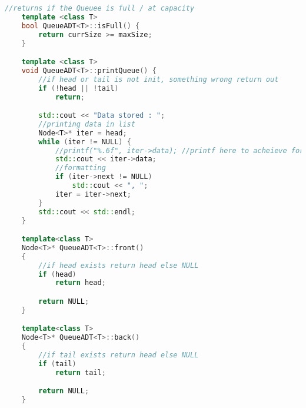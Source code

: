 \documentclass{report}
\begin{document}
\begin{lstlisting}[language=C++]
	//returns if the Queuee is full / at capacity
	template <class T>
	bool QueueADT<T>::isFull() {
		return currSize >= maxSize;
	}

	template <class T>
	void QueueADT<T>::printQueue() {
		//if head or tail is not init, something wrong return out
		if (!head || !tail)
			return;

		std::cout << "Data stored : ";
		//printing data in list
		Node<T>* iter = head;
		while (iter != NULL) {
			//printf("%.6f", iter->data); //printf here to acheieve format
			std::cout << iter->data;
			//formatting
			if (iter->next != NULL)
				std::cout << ", ";
			iter = iter->next;
		}
		std::cout << std::endl;
	}

	template<class T>
	Node<T>* QueueADT<T>::front()
	{
		//if head exists return head else NULL
		if (head)
			return head;

		return NULL;
	}

	template<class T>
	Node<T>* QueueADT<T>::back()
	{
		//if tail exists return head else NULL
		if (tail)
			return tail;

		return NULL;
	}


\end{lstlisting}
\end{document}

